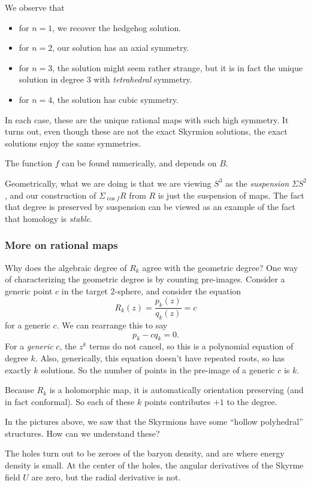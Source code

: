 \documentclass[a4paper]{article}
\begin{document}
We observe that
\begin{itemize}
  \item for $n = 1$, we recover the hedgehog solution.
  \item for $n = 2$, our solution has an axial symmetry.
  \item for $n = 3$, the solution might seem rather strange, but it is in fact the unique solution in degree $3$ with \emph{tetrahedral} symmetry.
  \item for $n = 4$, the solution has cubic symmetry.
\end{itemize}
In each case, these are the unique rational maps with such high symmetry. It turns out, even though these are not the exact Skyrmion solutions, the exact solutions enjoy the same symmetries.

The function $f$ can be found numerically, and depends on $B$.

Geometrically, what we are doing is that we are viewing $S^3$ as the \emph{suspension} $\Sigma S^2$, and our construction of $\Sigma_{\cos f} R$ from $R$ is just the suspension of maps. The fact that degree is preserved by suspension can be viewed as an example of the fact that homology is \emph{stable}.

\subsubsection*{More on rational maps}
Why does the algebraic degree of $R_k$ agree with the geometric degree? One way of characterizing the geometric degree is by counting pre-images. Consider a generic point $c$ in the target $2$-sphere, and consider the equation
\[
  R_k(z) = \frac{p_k(z)}{q_k(z)} = c
\]
for a generic $c$. We can rearrange this to say
\[
  p_k - c q_k = 0.
\]
For a \emph{generic} $c$, the $z^k$ terms do not cancel, so this is a polynomial equation of degree $k$. Also, generically, this equation doesn't have repeated roots, so has exactly $k$ solutions. So the number of points in the pre-image of a generic $c$ is $k$.

Because $R_k$ is a holomorphic map, it is automatically orientation preserving (and in fact conformal). So each of these $k$ points contributes $+1$ to the degree.

In the pictures above, we saw that the Skyrmions have some ``hollow polyhedral'' structures. How can we understand these?

The holes turn out to be zeroes of the baryon density, and are where energy density is small. At the center of the holes, the angular derivatives of the Skyrme field $U$ are zero, but the radial derivative is not. %
\end{document}
